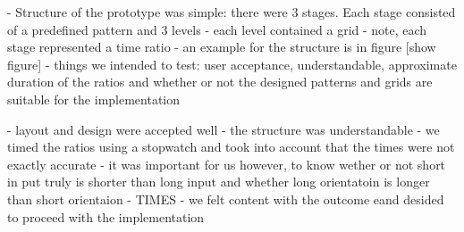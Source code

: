 - Structure of the prototype was simple: there were 3 stages. Each stage consisted of a predefined pattern and 3 levels 
- each level contained a grid
- note, each stage represented a time ratio 
- an example for the structure is in figure [show figure]
- things we intended to test: user acceptance, understandable, approximate duration of the ratios and whether or not the designed patterns and grids are suitable for the implementation

- layout and design were accepted well 
- the structure was  understandable 
- we timed the ratios using a stopwatch and took into account that the times were not exactly accurate
- it was important for us however, to know wether or not short in put truly is shorter than long input and whether long orientatoin is longer than short orientaion
- TIMES
- we felt content with the outcome eand desided to proceed with the implementation 


